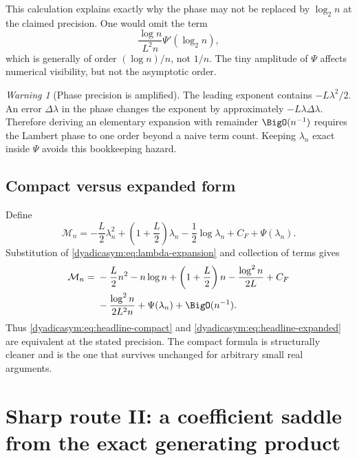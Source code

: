 \documentclass[11pt,oneside]{article}
\theoremstyle{definition}
\theoremstyle{remark}
\newtheorem{warning}[warning]{Warning}
\begin{document}
This calculation explains exactly why the phase may not be replaced by $\log_2n$ at the
claimed precision.  One would omit the term
\begin{equation}
 \frac{\log n}{L^2n}\Psi'(\log_2n),                         \label{dyadicasym:eq:missing-phase-term}
\end{equation}
which is generally of order $(\log n)/n$, not $1/n$.  The tiny amplitude of $\Psi$ affects
numerical visibility, but not the asymptotic order.

\begin{warning}[Phase precision is amplified]
The leading exponent contains $-L\lambda^2/2$.  An error $\Delta\lambda$ in the phase changes
the exponent by approximately $-L\lambda\Delta\lambda$.  Therefore deriving an elementary
expansion with remainder $\BigO(n^{-1})$ requires the Lambert phase to one order beyond a
naive term count.  Keeping $\lambda_n$ exact inside $\Psi$ avoids this bookkeeping hazard.
\end{warning}

\subsection{Compact versus expanded form}

Define
\begin{equation}
 \mathcal M_n=-\frac L2\lambda_n^2+
 \left(1+\frac L2\right)\lambda_n-\frac12\log\lambda_n
 +C_F+\Psi(\lambda_n).                                     \label{dyadicasym:eq:Mn}
\end{equation}
Substitution of \eqref{dyadicasym:eq:lambda-expansion} and collection of terms gives
\begin{align}
 \mathcal M_n={}&-\frac L2n^2-n\log n+
 \left(1+\frac L2\right)n-\frac{\log^2n}{2L}+C_F           \notag\\
 &-\frac{\log^2n}{2L^2n}+\Psi(\lambda_n)+\BigO(n^{-1}).   \label{dyadicasym:eq:compact-to-expanded}
\end{align}
Thus \eqref{dyadicasym:eq:headline-compact} and \eqref{dyadicasym:eq:headline-expanded} are equivalent at the stated
precision.  The compact formula is structurally cleaner and is the one that survives
unchanged for arbitrary small real arguments.

\section{Sharp route II: a coefficient saddle from the exact generating product}
\label{dyadicasym:sec:coefficient-saddle}
\end{document}
